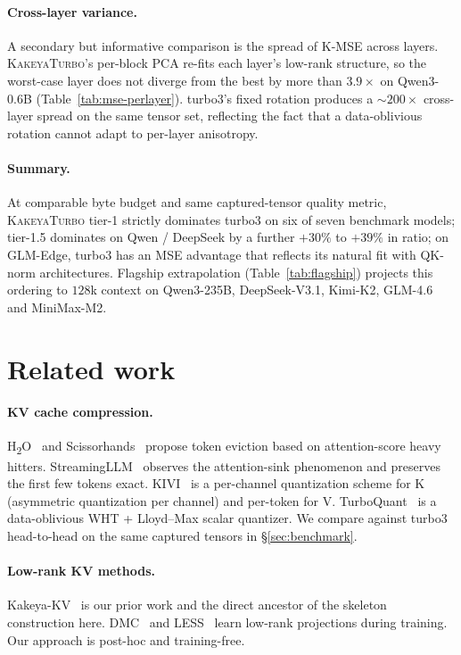 \documentclass[11pt,a4paper]{article}
\theoremstyle{definition}
\theoremstyle{plain}
\begin{document}
\paragraph{Cross-layer variance.}
A secondary but informative comparison is the spread of K-MSE across layers. \textsc{KakeyaTurbo}'s per-block PCA re-fits each layer's low-rank structure, so the worst-case layer does not diverge from the best by more than $3.9\times$ on Qwen3-0.6B (Table~\ref{tab:mse-perlayer}). turbo3's fixed rotation produces a $\sim 200\times$ cross-layer spread on the same tensor set, reflecting the fact that a data-oblivious rotation cannot adapt to per-layer anisotropy.

\paragraph{Summary.}
At comparable byte budget and same captured-tensor quality metric, \textsc{KakeyaTurbo} tier-1 strictly dominates turbo3 on six of seven benchmark models; tier-1.5 dominates on Qwen / DeepSeek by a further $+30\%$ to $+39\%$ in ratio; on GLM-Edge, turbo3 has an MSE advantage that reflects its natural fit with QK-norm architectures. Flagship extrapolation (Table~\ref{tab:flagship}) projects this ordering to $128$k context on Qwen3-235B, DeepSeek-V3.1, Kimi-K2, GLM-4.6 and MiniMax-M2.

\section{Related work}
\label{sec:related}

\paragraph{KV cache compression.} H\textsubscript{2}O~\cite{h2o} and Scissorhands~\cite{scissorhands} propose token eviction based on attention-score heavy hitters. StreamingLLM~\cite{streaming-llm} observes the attention-sink phenomenon and preserves the first few tokens exact. KIVI~\cite{kivi} is a per-channel quantization scheme for K (asymmetric quantization per channel) and per-token for V. TurboQuant~\cite{turboquant} is a data-oblivious WHT + Lloyd--Max scalar quantizer. We compare against turbo3 head-to-head on the same captured tensors in \S\ref{sec:benchmark}.

\paragraph{Low-rank KV methods.} Kakeya-KV~\cite{kakeya-kv} is our prior work and the direct ancestor of the skeleton construction here. DMC~\cite{dmc} and LESS~\cite{less} learn low-rank projections during training. Our approach is post-hoc and training-free.
\end{document}
